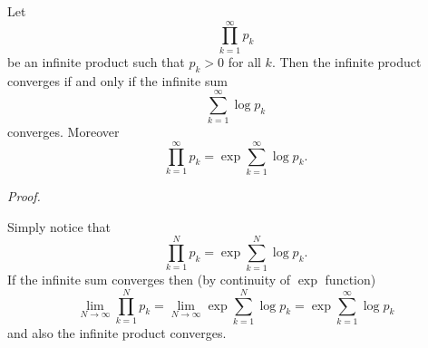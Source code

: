 \documentclass[12pt]{article}
\theoremstyle{remark}
\begin{document}
Let 
\[
  \prod_{k=1}^\infty p_k
\]
be an infinite product such that $p_k>0$ for all $k$.
Then the infinite product converges if and only if the infinite sum
\[
  \sum_{k=1}^\infty \log p_k
\]
converges. Moreover
\[
  \prod_{k=1}^\infty p_k = \exp \sum_{k=1}^\infty \log p_k.
\]

\emph{Proof.}

Simply notice that
\[
  \prod_{k=1}^N p_k = \exp \sum_{k=1}^N \log p_k.
\]
If the infinite sum converges then (by continuity of $\exp$ function)
\[
  \lim_{N\to \infty} \prod_{k=1}^N p_k = \lim_{N\to\infty} \exp \sum_{k=1}^N \log p_k = \exp \sum_{k=1}^\infty \log p_k
\]
and also the infinite product converges.
\end{document}
